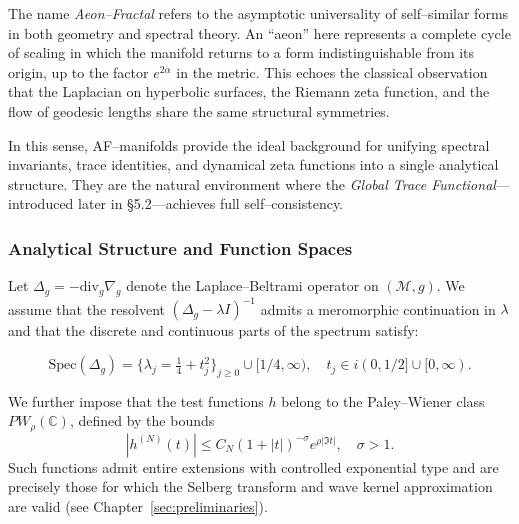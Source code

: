 
\begin{remark}
The name \emph{Aeon–Fractal} refers to the asymptotic universality
of self–similar forms in both geometry and spectral theory.
An “aeon” here represents a complete cycle of scaling
in which the manifold returns to a form indistinguishable from its origin,
up to the factor \(e^{2\alpha}\) in the metric.
This echoes the classical observation that the Laplacian on hyperbolic surfaces,
the Riemann zeta function, and the flow of geodesic lengths
share the same structural symmetries.

In this sense, AF–manifolds provide the ideal background
for unifying spectral invariants, trace identities,
and dynamical zeta functions into a single analytical structure.
They are the natural environment where the
\emph{Global Trace Functional}—introduced later in \S5.2—achieves full self–consistency.
\end{remark}


\subsubsection*{Analytical Structure and Function Spaces}

Let \(\Delta_g = -\mathrm{div}_g\nabla_g\) denote the Laplace–Beltrami operator
on \((\mathcal{M},g)\).
We assume that the resolvent \((\Delta_g - \lambda I)^{-1}\)
admits a meromorphic continuation in \(\lambda\)
and that the discrete and continuous parts of the spectrum satisfy:

\[
\mathrm{Spec}(\Delta_g) =
\{\lambda_j = \tfrac{1}{4}+t_j^2\}_{j\ge 0} \cup [1/4,\infty),
\quad
t_j \in i(0,1/2] \cup [0,\infty).
\]

We further impose that the test functions \(h\)
belong to the Paley–Wiener class \(PW_\rho(\mathbb{C})\),
defined by the bounds
\[
|h^{(N)}(t)| \le C_N (1+|t|)^{-\sigma} e^{\rho |\Im t|},
\quad \sigma>1.
\]
Such functions admit entire extensions with controlled exponential type
and are precisely those for which the Selberg transform
and wave kernel approximation are valid (see Chapter~\ref{sec:preliminaries}).

